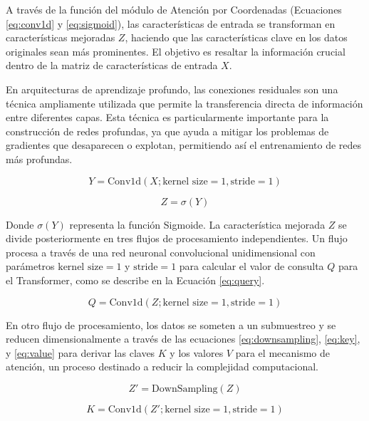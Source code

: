 A través de la función del módulo de Atención por Coordenadas (Ecuaciones \ref{eq:conv1d} y \ref{eq:sigmoid}), las características de entrada se transforman en características mejoradas $Z$, haciendo que las características clave en los datos originales sean más prominentes. El objetivo es resaltar la información crucial dentro de la matriz de características de entrada $X$. 

En arquitecturas de aprendizaje profundo, las conexiones residuales son una técnica ampliamente utilizada que permite la transferencia directa de información entre diferentes capas. Esta técnica es particularmente importante para la construcción de redes profundas, ya que ayuda a mitigar los problemas de gradientes que desaparecen o explotan, permitiendo así el entrenamiento de redes más profundas.

\begin{equation}
Y = \text{Conv1d}(X; \text{kernel size} = 1, \text{stride} = 1)
\label{eq:conv1d}
\end{equation}

\begin{equation}
Z = \sigma(Y)
\label{eq:sigmoid}
\end{equation}

Donde $\sigma(Y)$ representa la función Sigmoide. La característica mejorada $Z$ se divide posteriormente en tres flujos de procesamiento independientes. Un flujo procesa a través de una red neuronal convolucional unidimensional con parámetros $\text{kernel size} = 1$ y $\text{stride} = 1$ para calcular el valor de consulta $Q$ para el Transformer, como se describe en la Ecuación \ref{eq:query}.

\begin{equation}
Q = \text{Conv1d}(Z; \text{kernel size} = 1, \text{stride} = 1)
\label{eq:query}
\end{equation}

En otro flujo de procesamiento, los datos se someten a un submuestreo y se reducen dimensionalmente a través de las ecuaciones \ref{eq:downsampling}, \ref{eq:key}, y \ref{eq:value} para derivar las claves $K$ y los valores $V$ para el mecanismo de atención, un proceso destinado a reducir la complejidad computacional.

\begin{equation}
Z' = \text{DownSampling}(Z)
\label{eq:downsampling}
\end{equation}

\begin{equation}
K = \text{Conv1d}(Z'; \text{kernel size} = 1, \text{stride} = 1)
\label{eq:key}
\end{equation}

